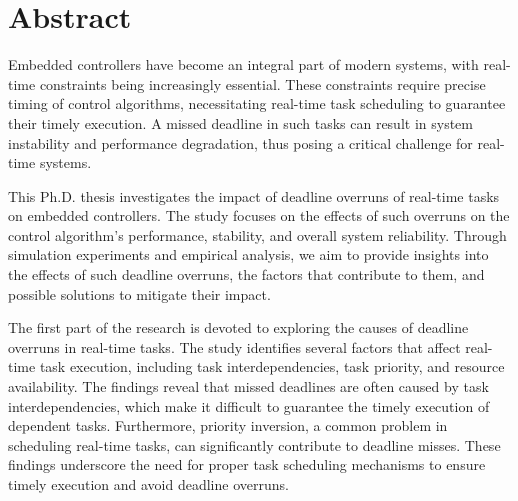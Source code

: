 \chapter*{Abstract}



Embedded controllers have become an integral part of modern systems, with real-time constraints being increasingly essential.
These constraints require precise timing of control algorithms, necessitating real-time task scheduling to guarantee their timely execution.
A missed deadline in such tasks can result in system instability and performance degradation, thus posing a critical challenge for real-time systems.

This Ph.D. thesis investigates the impact of deadline overruns of real-time tasks on embedded controllers.
The study focuses on the effects of such overruns on the control algorithm's performance, stability, and overall system reliability.
Through simulation experiments and empirical analysis, we aim to provide insights into the effects of such deadline overruns, the factors that contribute to them, and possible solutions to mitigate their impact.

The first part of the research is devoted to exploring the causes of deadline overruns in real-time tasks.
The study identifies several factors that affect real-time task execution, including task interdependencies, task priority, and resource availability.
The findings reveal that missed deadlines are often caused by task interdependencies, which make it difficult to guarantee the timely execution of dependent tasks.
Furthermore, priority inversion, a common problem in scheduling real-time tasks, can significantly contribute to deadline misses.
These findings underscore the need for proper task scheduling mechanisms to ensure timely execution and avoid deadline overruns.

